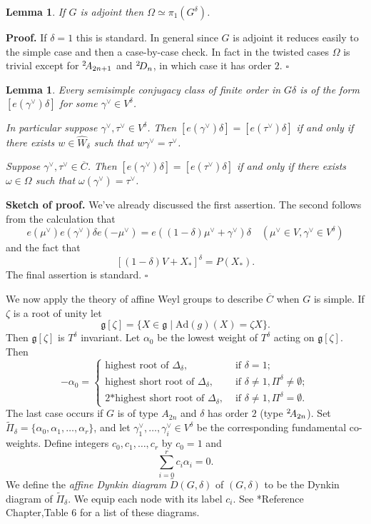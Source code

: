\documentclass[10pt,leqno]{article}
\newtheorem{lemma}[equation]{Lemma}
\newcommand{\qed}{\hfill $\square$ \medskip}
\newenvironment{proof}[1][Proof]{\noindent\textbf{#1.} }{\qed}
\newcommand{\Ad}{\text{Ad}}
\newcommand{\ch}[1]{#1^\vee}
\newcommand{\g}{\mathfrak g}
\newcommand\wt{\widetilde}
\newcommand\wh{\widehat}
\newcommand{\Daffine}{\wt D(G,\delta)}
\newcommand{\twoAeven}{\phantom{}^2\negthinspace A_{2n}}
\newcommand{\twoAodd}{\phantom{}^2\negthinspace A_{2n+1}}
\newcommand{\twoD}{\phantom{}^2\negthinspace D_{n}}
\begin{document}
\begin{lemma}
\label{l:Omega}
If $G$ is adjoint then $\Omega\simeq \pi_1(G^\delta)$.
\end{lemma}

\begin{proof}
If $\delta=1$ this is standard. In general since $G$ is adjoint it
reduces easily to the simple case and then a case-by-case check. In
fact in the twisted cases $\Omega$ is trivial except for $\twoAodd$ and $\twoD$, in which case it has order $2$.
\end{proof}



\begin{lemma}
\label{l:kac1}
Every semisimple conjugacy class of finite order in $G\delta$ is of
the form $[e(\ch\gamma)\delta]$ for some $\ch\gamma\in V^\delta$.
  
In particular suppose $\ch\gamma,\ch\tau\in V^\delta$.  Then $[e(\ch\gamma)\delta]=[e(\ch\tau)\delta]$ if and only if there exists $w\in \wh W_\delta$
such that $w\ch\gamma=\ch\tau$.

Suppose $\ch\gamma,\ch\tau\in \overline C$. Then
$[e(\ch\gamma)\delta]=[e(\ch\tau)\delta]$ if and only if there exists
$\omega\in \Omega$ such that $\omega(\ch\gamma)=\ch\tau$.

\end{lemma}

\begin{proof}[Sketch of proof]
We've already discussed the first assertion. The second follows from
the calculation that
$$
e(\ch\mu)e(\ch\gamma)\delta e(-\ch\mu)=e((1-\delta)\ch\mu+\ch\gamma)\delta\quad (\ch\mu\in V,\ch\gamma\in V^\delta)
$$
and the fact that
$$
[(1-\delta)V+X_*]^\delta=P(X_*).
$$
The final assertion is standard.
\end{proof}

We now apply the  theory of  affine Weyl groups to describe $\overline C$
when $G$ is simple.
If $\zeta$ is a root of unity let
$$
\g[\zeta]=\{X\in \g\mid \Ad(g)(X)=\zeta X\}.
$$
Then $\g[\zeta]$ is $T^\delta$ invariant. Let $\alpha_0$ be the lowest weight of $T^\delta$ acting on $\g[\zeta]$.
Then
$$
-\alpha_0=
\begin{cases}
  \text{highest root of }\Delta_\delta, &\text{ if } \delta=1;\\
  \text{highest short root of }\Delta_\delta, &\text{ if }\delta\ne 1,\Pi^\delta\ne\emptyset;\\
  \text{2*highest short root of }\Delta_\delta, &\text{ if }\delta\ne 1,\Pi^\delta=\emptyset.
\end{cases}
$$
The last case occurs if $G$ is of type $A_{2n}$ and $\delta$ has order $2$ (type $\twoAeven$).
Set $\wt\Pi_\delta=\{\alpha_0,\alpha_1,\dots,\alpha_r\}$,
and let $\ch\gamma_1,\dots,\ch\gamma_i\in V^\delta$ be the corresponding fundamental co-weights.
Define integers $c_0,c_1,\dots, c_r$ by $c_0=1$ and 
$$
\sum_{i=0}^r c_i\alpha_i=0.
$$
We define the {\it affine Dynkin diagram}  $\Daffine$ of $(G,\delta)$ to be the
Dynkin diagram of $\wt\Pi_\delta$. We equip each node with its label $c_i$.
See \cite{ov}*{Reference Chapter,Table 6} for a list of these diagrams.
\end{document}

